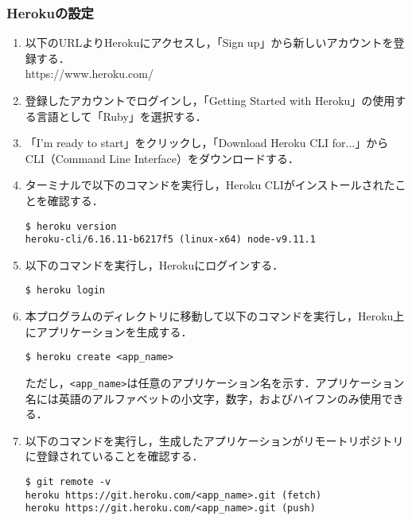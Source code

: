 \documentclass[12pt]{jsarticle}
\begin{document}
\subsubsection{Herokuの設定}
\begin{enumerate}
\item 以下のURLよりHerokuにアクセスし，「Sign up」から新しいアカウントを登録する．\\
https://www.heroku.com/

\item 登録したアカウントでログインし，「Getting Started with Heroku」の使用する言語として「Ruby」を選択する．

\item 「I'm ready to start」をクリックし，「Download Heroku CLI for...」からCLI（Command Line Interface）をダウンロードする．

\item ターミナルで以下のコマンドを実行し，Heroku CLIがインストールされたことを確認する．
\begin{verbatim}
$ heroku version
heroku-cli/6.16.11-b6217f5 (linux-x64) node-v9.11.1
\end{verbatim}

\item 以下のコマンドを実行し，Herokuにログインする．
\begin{verbatim}
$ heroku login
\end{verbatim}

\item 本プログラムのディレクトリに移動して以下のコマンドを実行し，Heroku上にアプリケーションを生成する．
\begin{verbatim}
$ heroku create <app_name>
\end{verbatim}
ただし，\verb|<app_name>|は任意のアプリケーション名を示す．アプリケーション名には英語のアルファベットの小文字，数字，およびハイフンのみ使用できる．

\item 以下のコマンドを実行し，生成したアプリケーションがリモートリポジトリに登録されていることを確認する．
\begin{verbatim}
$ git remote -v
heroku https://git.heroku.com/<app_name>.git (fetch)
heroku https://git.heroku.com/<app_name>.git (push)
\end{verbatim}
\end{enumerate}
\end{document}
